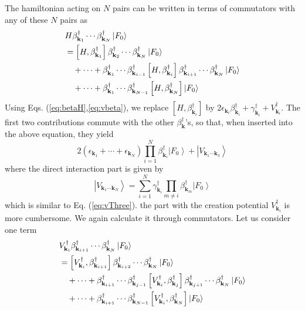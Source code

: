 \documentclass[aps,prb,superscriptaddress,showpacs,reprint,lengthcheck]{revtex4-1}
\newcommand{\vk}{\ensuremath{\mathbf{k}}}
\begin{document}
The hamiltonian acting on $N$ pairs can be written in terms of commutators with any of these $N$ pairs as 
\begin{equation}\label{eq:HN}
\begin{split}
&H\beta^{\dagger}_{\mathbf{k} _1}\cdots\beta^{\dagger}_{\mathbf{k}
_N}\left|F_0\right> \\
&=\left[H,\beta^{\dagger}_{\mathbf{k} _1}\right]  \beta^{\dagger}_{%
\mathbf{k} _2}\cdots\beta^{\dagger}_{\mathbf{k} _N}\left|F_0\right> \\
&\quad+\cdots+\beta^{\dagger}_{\mathbf{k} _1}\cdots\beta^{\dagger}_{\mathbf{k} _{i-1}}
\left[H,\beta^{\dagger}_{\mathbf{k} _i}\right]  \beta^{\dagger}_{\mathbf{k}
_{i+1}}\cdots \beta^{\dagger}_{\mathbf{k}_{N}}\left|F_0\right>\\
&\quad+\cdots+\beta^{\dagger}_{\mathbf{k} _1}\cdots\beta^{\dagger}_{\mathbf{k} _{N-1}}
\left[H,\beta^{\dagger}_{\mathbf{k} _N}\right] \left|F_0\right>
\end{split}
\end{equation}
Using Eqs. (\ref{eq:betaH},\ref{eq:vbeta}), we replace $\left[H,\beta^{\dagger}_{\mathbf{k} _i}\right]$ by $2\epsilon_{\vk_i}\beta^{\dagger}_{\vk_i}+\gamma^{\dagger}_{\vk_i}+V^{\dagger}_{\vk_i}$.  The first two contributions commute with the other $\beta^\dagger_\vk$'s, so that, when inserted into the above equation, they yield
\begin{equation}
2\left(\epsilon_{\mathbf{k} _1}+\cdots+\epsilon_{\mathbf{k} _N}\right)
\prod^N_{i=1}\beta^{\dagger}_{\mathbf{k} _i}\left|F_0\right>+\left|{V}_{\mathbf{k} _1\cdots\mathbf{k} _3}\right> 
\end{equation}
where the direct interaction part is given by 
\begin{equation}  
\left|V_{\mathbf{k} _1\cdots\mathbf{k} _N}\right> =\sum^N_{i=1}\gamma^{\dagger}_{\mathbf{k}_i}\prod_{m\neq{i}}\beta^{\dagger}_{\mathbf{k} _m}\left|F_0\right>   
\end{equation}
which is similar to Eq. (\ref{eq:vThree}).  the part with the creation potential $V^\dagger_{\mathbf{k}_i}$ is more cumbersome.  We again calculate it through commutators.  Let us consider one term
\begin{equation}
\begin{split}
&V^{\dagger}_{\mathbf{k} _{i}}\beta^{\dagger}_{\mathbf{k} _{i+1}}\cdots\beta^{\dagger}_{\mathbf{k}
_N}\left|F_0\right> \\
&=\left[V^{\dagger}_{\mathbf{k} _{i}},\beta^{\dagger}_{\mathbf{k} _{i+1}}\right]  \beta^{\dagger}_{%
\mathbf{k} _{i+2}}\cdots\beta^{\dagger}_{\mathbf{k} _N}\left|F_0\right> \\
&\quad+\cdots+\beta^{\dagger}_{\mathbf{k} _{i+1}}\cdots\beta^{\dagger}_{\mathbf{k} _{j-1}}
\left[V^{\dagger}_{\mathbf{k} _{i}},\beta^{\dagger}_{\mathbf{k} _j}\right]  \beta^{\dagger}_{\mathbf{k}
_{j+1}}\cdots \beta^{\dagger}_{\mathbf{k}_{N}}\left|F_0\right>\\
&\quad+\cdots+\beta^{\dagger}_{\mathbf{k} _{i+1}}\cdots\beta^{\dagger}_{\mathbf{k} _{N-1}}
\left[V^{\dagger}_{\mathbf{k} _{i}},\beta^{\dagger}_{\mathbf{k} _N}\right] \left|F_0\right>
\end{split}
\end{equation}
\end{document}
